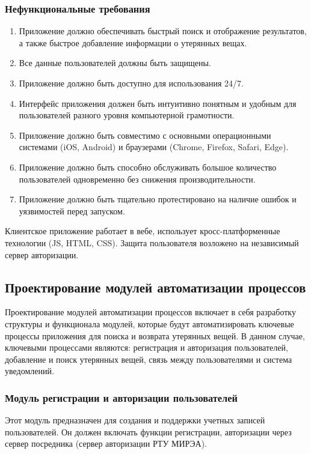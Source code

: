 \subsubsection{Нефункциональные требования}

\begin{enumerate}
	\item Приложение должно обеспечивать быстрый поиск и отображение результатов, а также быстрое добавление информации о утерянных вещах.
	\item Все данные пользователей должны быть защищены.
	\item Приложение должно быть доступно для использования 24/7.
	\item Интерфейс приложения должен быть интуитивно понятным и удобным для пользователей разного уровня компьютерной грамотности.
	\item Приложение должно быть совместимо с основными операционными системами (iOS, Android) и браузерами (Chrome, Firefox, Safari, Edge).
	\item Приложение должно быть способно обслуживать большое количество пользователей одновременно без снижения производительности.
	\item Приложение должно быть тщательно протестировано на наличие ошибок и уязвимостей перед запуском.
\end{enumerate}

Клиентское приложение работает в вебе, использует кросс-платформенные технологии (JS, HTML, CSS). Защита пользователя возложено на независимый сервер авторизации.

\subsection{Проектирование модулей автоматизации процессов}

Проектирование модулей автоматизации процессов включает в себя разработку структуры и функционала модулей, которые будут автоматизировать ключевые процессы приложения для поиска и возврата утерянных вещей. В данном случае, ключевыми процессами являются: регистрация и авторизация пользователей, добавление и поиск утерянных вещей, связь между пользователями и система уведомлений.

\subsubsection{Модуль регистрации и авторизации пользователей}

Этот модуль предназначен для создания и поддержки учетных записей пользователей. Он должен включать функции регистрации, авторизации через сервер посредника (сервер авторизации РТУ МИРЭА).


